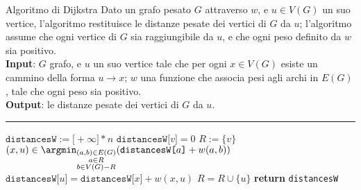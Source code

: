 \documentclass[a4paper, 12pt]{report}
\begin{document}
    \begin{framedalgo}{Algoritmo di Dijkstra}
        Dato un grafo pesato $G$ attraverso $w$, e $u \in V(G)$ un suo vertice, l'algoritmo restituisce le distanze pesate dei vertici di $G$ da $u$; l'algoritmo assume che ogni vertice di $G$ sia raggiungibile da $u$, e che ogni peso definito da $w$ sia positivo.\\
        \textbf{Input}: $G$ grafo, e $u$ un suo vertice tale che per ogni $x \in V(G)$ esiste un cammino della forma $u \rightarrow x$; $w$ una funzione che associa pesi agli archi in $E(G)$, tale che ogni peso sia positivo.\\
        \textbf{Output}: le distanze pesate dei vertici di $G$ da $u$.

        \hrule
        \begin{algorithmic}[1]
                \State $\texttt{distancesW} := \texttt{[}+ \infty \texttt{]} * n$ 
                \State $\texttt{distancesW[}v\texttt{]} = 0$
                \State $R := \{v\}$
                    \State $\displaystyle (x, u) \in \argmin_{\substack{(a, b) \in E(G) \\ a \in R \\ b \in V(G) - R}}{\left(\texttt{distancesW[}a\texttt{]} + w(a, b)\right)}$
                    \State $\texttt{distancesW[}u\texttt{]} = \texttt{distancesW[}x\texttt{]} + w(x, u)$
                    \State $R = R \cup \{u\}$
                \EndWhile
                \State \textbf{return} \texttt{distancesW}
            \EndFunction
        \end{algorithmic}
    \end{framedalgo}
\end{document}
